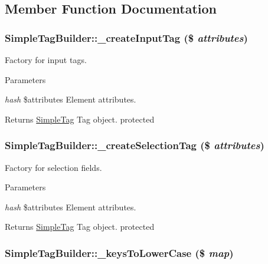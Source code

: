 \subsection{Member Function Documentation}
\hypertarget{class_simple_tag_builder_af5b0ee595950c591169a3b9a3f7f0d91}{
\subsubsection[{\_\-createInputTag}]{\setlength{\rightskip}{0pt plus 5cm}SimpleTagBuilder::\_\-createInputTag (\$ {\em attributes})}}
\label{class_simple_tag_builder_af5b0ee595950c591169a3b9a3f7f0d91}
Factory for input tags. 
\begin{DoxyParams}{Parameters}
\item[{\em hash}]\$attributes Element attributes. \end{DoxyParams}
\begin{DoxyReturn}{Returns}
\hyperlink{class_simple_tag}{SimpleTag} Tag object.  protected 
\end{DoxyReturn}
\hypertarget{class_simple_tag_builder_aa370216e692feedf69ca7b5ace1804e1}{
\subsubsection[{\_\-createSelectionTag}]{\setlength{\rightskip}{0pt plus 5cm}SimpleTagBuilder::\_\-createSelectionTag (\$ {\em attributes})}}
\label{class_simple_tag_builder_aa370216e692feedf69ca7b5ace1804e1}
Factory for selection fields. 
\begin{DoxyParams}{Parameters}
\item[{\em hash}]\$attributes Element attributes. \end{DoxyParams}
\begin{DoxyReturn}{Returns}
\hyperlink{class_simple_tag}{SimpleTag} Tag object.  protected 
\end{DoxyReturn}
\hypertarget{class_simple_tag_builder_af948b060e63eff87637beb993b35f072}{
\subsubsection[{\_\-keysToLowerCase}]{\setlength{\rightskip}{0pt plus 5cm}SimpleTagBuilder::\_\-keysToLowerCase (\$ {\em map})}}
